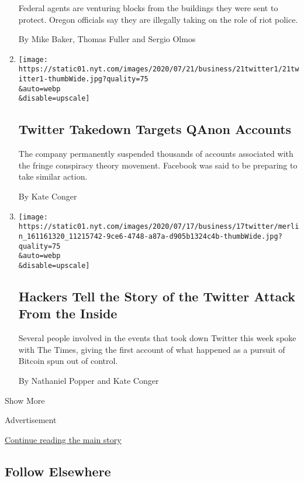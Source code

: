 \begin{enumerate}
  Federal agents are venturing blocks from the buildings they were sent
  to protect. Oregon officials say they are illegally taking on the role
  of riot police.

  By Mike Baker, Thomas Fuller and Sergio Olmos
\item
  \href{/2020/07/21/technology/twitter-bans-qanon-accounts.html}{}

  \texttt{[image: https://static01.nyt.com/images/2020/07/21/business/21twitter1/21twitter1-thumbWide.jpg?quality=75\\\&auto=webp\\\&disable=upscale]}

  \hypertarget{twitter-takedown-targets-qanon-accounts}{%
  \subsection{Twitter Takedown Targets QAnon
  Accounts}\label{twitter-takedown-targets-qanon-accounts}}

  The company permanently suspended thousands of accounts associated
  with the fringe conspiracy theory movement. Facebook was said to be
  preparing to take similar action.

  By Kate Conger
\item
  \href{/2020/07/17/technology/twitter-hackers-interview.html}{}

  \texttt{[image: https://static01.nyt.com/images/2020/07/17/business/17twitter/merlin\_161161320\_11215742-9ce6-4748-a87a-d905b1324c4b-thumbWide.jpg?quality=75\\\&auto=webp\\\&disable=upscale]}

  \hypertarget{hackers-tell-the-story-of-the-twitter-attack-from-the-inside}{%
  \subsection{Hackers Tell the Story of the Twitter Attack From the
  Inside}\label{hackers-tell-the-story-of-the-twitter-attack-from-the-inside}}

  Several people involved in the events that took down Twitter this week
  spoke with The Times, giving the first account of what happened as a
  pursuit of Bitcoin spun out of control.

  By Nathaniel Popper and Kate Conger
\end{enumerate}

Show More

Advertisement

\protect\hyperlink{after-mid2}{Continue reading the main story}

\hypertarget{follow-elsewhere}{%
\subsection{Follow Elsewhere}\label{follow-elsewhere}}

